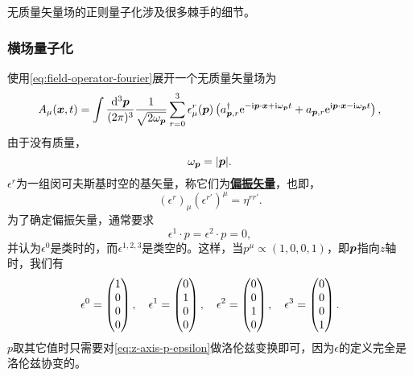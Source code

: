 \documentclass[hyperref, UTF8, a4paper]{ctexart}
\newcommand*{\ii}{\mathrm{i}}
\newcommand*{\ee}{\mathrm{e}}
\newcommand{\concept}[1]{\underline{\textbf{#1}}}
\begin{document}
无质量矢量场的正则量子化涉及很多棘手的细节。

\subsubsection{横场量子化}

使用\eqref{eq:field-operator-fourier}展开一个无质量矢量场为
\begin{equation}
    A_\mu (\vb*{x}, t) = \int \frac{\dd[3]{\vb*{p}}}{(2\pi)^3} \frac{1}{\sqrt{2 \omega_{\vb*{p}}}} \sum_{r=0}^3 \epsilon_\mu^r(\vb*{p}) \left({a}_{\vb*{p}, r}^\dagger \ee^{ - \ii \vb*{p} \cdot \vb*{x} + \ii \omega_{\vb*{p}} t} + {a}_{\vb*{p}, r} \ee^{ \ii \vb*{p} \cdot \vb*{x} - \ii \omega_{\vb*{p}} t} \right), 
    \label{eq:expanding-massless-vector-field}
\end{equation}
由于没有质量，
\begin{equation}
    \omega_{\vb*{p}} = \abs{\vb*{p}}.
\end{equation}
$\epsilon^r$为一组闵可夫斯基时空的基矢量，称它们为\concept{偏振矢量}，也即，
\begin{equation}
    (\epsilon^r)_\mu (\epsilon^{r'})^\mu = \eta^{r r'}.
\end{equation}
为了确定偏振矢量，通常要求
\begin{equation}
    \epsilon^1 \cdot p = \epsilon^2 \cdot p = 0,
\end{equation}
并认为$\epsilon^0$是类时的，而$\epsilon^{1,2,3}$是类空的。这样，当$p^\mu \propto (1, 0, 0, 1)$，即$\vb*{p}$指向$z$轴时，我们有
\begin{equation}
    \epsilon^0 = \pmqty{1 \\ 0 \\ 0 \\ 0}, \quad \epsilon^1 = \pmqty{0 \\ 1 \\ 0 \\ 0}, \quad \epsilon^2 = \pmqty{0 \\ 0 \\ 1 \\ 0}, \quad \epsilon^3 = \pmqty{0 \\ 0 \\ 0 \\ 1}.
    \label{eq:z-axis-p-epsilon}
\end{equation}
$p$取其它值时只需要对\eqref{eq:z-axis-p-epsilon}做洛伦兹变换即可，因为$\epsilon$的定义完全是洛伦兹协变的。
\end{document}
